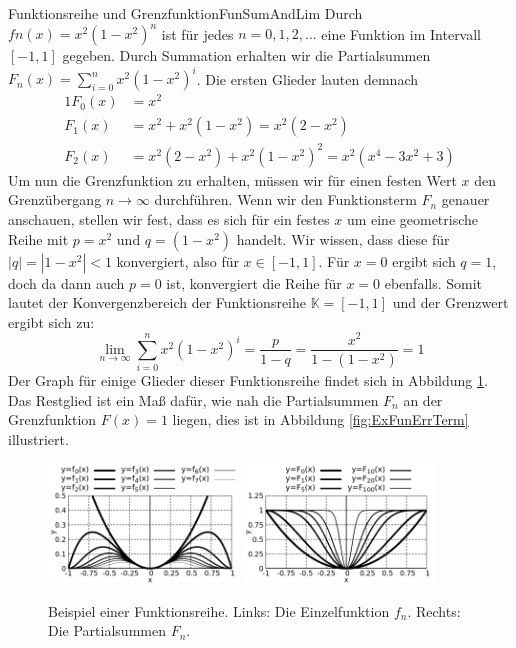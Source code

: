 \begin{example}{Funktionsreihe und Grenzfunktion}{FunSumAndLim}
    Durch $fn(x) = x^2 (1-x^2)^n$ ist für jedes $n=0,1,2,\dots$ eine Funktion im Intervall $[-1,1]$ gegeben. Durch Summation erhalten wir die Partialsummen $F_n(x) = \sum\limits_{i=0}^n x^2 (1-x^2)^i$. Die ersten Glieder lauten demnach
    \begin{alignat*}{1}
        F_0(x) &= x^2 \\
        F_1(x) &= x^2 + x^2 (1-x^2) = x^2 (2-x^2) \\
        F_2(x) &= x^2 (2-x^2) + x^2 (1-x^2)^2 = x^2 (x^4-3x^2+3)
    \end{alignat*}
    Um nun die Grenzfunktion zu erhalten, müssen wir für einen festen Wert $x$ den Grenzübergang $n \to \infty$ durchführen. Wenn wir den Funktionsterm $F_n$ genauer anschauen, stellen wir fest, dass es sich für ein festes $x$ um eine geometrische Reihe mit $p=x^2$ und $q=(1-x^2)$ handelt. Wir wissen, dass diese für $|q|=|1-x^2|<1$ konvergiert, also für $x \in [-1,1]$. Für $x=0$ ergibt sich $q=1$, doch da dann auch $p=0$ ist, konvergiert die Reihe für $x=0$ ebenfalls. Somit lautet der Konvergenzbereich der Funktionsreihe $\mathbb{K} = [-1,1]$ und der Grenzwert ergibt sich zu:
    $$
        \lim\limits_{n\to\infty} \sum\limits_{i=0}^n x^2 (1-x^2)^i = \frac{p}{1-q} = \frac{x^2}{1-(1-x^2)} = 1
    $$
    Der Graph für einige Glieder dieser Funktionsreihe findet sich in Abbildung \ref{fig:ExFunSum}. Das Restglied ist ein Maß dafür, wie nah die Partialsummen $F_n$ an der Grenzfunktion $F(x) = 1$ liegen, dies ist in Abbildung \ref{fig:ExFunErrTerm} illustriert.
\end{example}

\begin{figure}
    \centering
    \includegraphics[width=0.45\textwidth]{./gnuplot/example-function-sum}
    \includegraphics[width=0.45\textwidth]{./gnuplot/example-function-sum-summed}
    \caption{Beispiel einer Funktionsreihe. Links: Die Einzelfunktion $f_n$. Rechts: Die Partialsummen $F_n$.}
    \label{fig:ExFunSum}
\end{figure}

